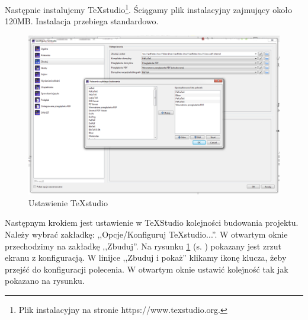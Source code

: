Następnie instalujemy \TeX{}studio\footnote{Plik instalacyjny na stronie  https://www.texstudio.org\cite{www3}.}. Ściągamy plik instalacyjny zajmujący około 120MB. Instalacja przebiega standardowo.

\begin{figure}[!hbt]
  \begin{center}
    \includegraphics[width=\linewidth]{rys/ustawienie.png}
    \caption{Ustawienie TeXstudio}
    \label{rys:ustawienia}
  \end{center}
\end{figure}

Następnym krokiem jest ustawienie w \TeX{}Studio kolejności budowania projektu. Należy wybrać zakładkę: ,,Opcje/Konfiguruj \TeX{}studio...''. W otwartym oknie przechodzimy na zakładkę ,,Zbuduj''. Na rysunku \ref{rys:ustawienia} (s. \pageref{rys:ustawienia}) pokazany jest zrzut ekranu z konfiguracją. W linijce ,,Zbuduj i pokaż'' klikamy ikonę klucza, żeby przejść do konfiguracji polecenia. W otwartym oknie ustawić kolejność tak jak pokazano na rysunku.
